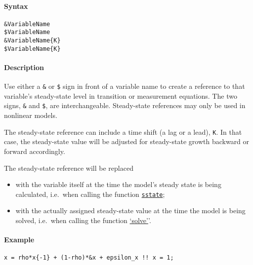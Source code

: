 


	\paragraph{Syntax}

\begin{verbatim}
&VariableName
$VariableName
&VariableName{K}
$VariableName{K}
\end{verbatim}

\paragraph{Description}

Use either a \texttt{\&} or \texttt{\$} sign in front of a variable name
to create a reference to that variable's steady-state level in
transition or measurement equations. The two signs, \texttt{\&} and
\texttt{\$}, are interchangeable. Steady-state references may only be
used in nonlinear models.

The steady-state reference can include a time shift (a lag or a lead),
\texttt{K}. In that case, the steady-state value will be adjusted for
steady-state growth backward or forward accordingly.

The steady-state reference will be replaced

\begin{itemize}
\item
  with the variable itself at the time the model's steady state is being
  calculated, i.e.~when calling the function
  \href{model/sstate}{\texttt{sstate}};
\item
  with the actually assigned steady-state value at the time the model is
  being solved, i.e.~when calling the function
  \href{model/solve}{`solve'}'.
\end{itemize}

\paragraph{Example}

\begin{verbatim}
x = rho*x{-1} + (1-rho)*&x + epsilon_x !! x = 1;
\end{verbatim}



